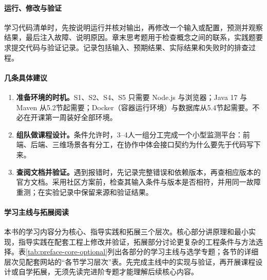 \paragraph{运行、修改与验证}学习代码清单时，先按说明运行并核对输出，再修改一个输入或配置，预测并观察结果，最后注入故障、说明原因。章末思考题用于检查概念之间的联系，实践题要求提交代码与验证记录。记录包括输入、预期结果、实际结果和失败时的排查过程。

\paragraph{几条具体建议}
\begin{enumerate}
\item \textbf{准备环境的时机。}S1、S2、S4、S5 只需要 Node.js 与浏览器；Java 17 与 Maven 从5.2节起需要；Docker（容器运行环境）与数据库从5.4节起需要。不必在开课第一周装好全部环境。
\item \textbf{组队做课程设计。}条件允许时，3--4人一组分工完成一个小型监测平台：前端、后端、三维场景各有分工，在协作中体会接口契约为什么要先于代码写下来。
\item \textbf{查阅文档并验证。}遇到报错时，先记录完整错误和依赖版本，再查相应版本的官方文档。采用社区方案前，检查其输入条件与版本是否相符，并用同一故障重测；在实验记录中保留来源和验证结果。
\end{enumerate}

\paragraph{学习主线与拓展阅读}本书的学习内容分为核心、指导实践和拓展三个层次。核心部分讲原理和最小实现，指导实践在配套工程上修改并验证，拓展部分讨论更复杂的工程条件与方法选择。表\ref{tab:preface-core-optional}列出各部分的学习主线与选学专题；各节的详细层次见配套网站的“各节学习层次”表。先完成主线中的实现与验证，再开展课程设计或自学拓展，无须先读完进阶专题才能理解后续核心内容。


